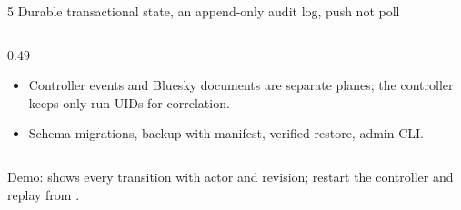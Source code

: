 \begin{frame}{5 \quad Durable transactional state, an append-only audit log, push not poll}
\begin{columns}[T]
\begin{column}{0.49\textwidth}
\begin{block}{\vtwo{}}
\begin{itemize}
                           resume without gaps; 15\,s heartbeat comment.
                    \item Controller events and Bluesky documents are separate planes; the controller keeps
                          only run UIDs for correlation.
                    \item Schema migrations, backup with manifest, verified restore, admin CLI.
                \end{itemize}
            \end{block}
        \end{column}
    \end{columns}
    \vspace{0.1cm}
    {\footnotesize\color{qsgray} Demo:  shows every transition with actor and revision;
    restart the controller and replay from .\par}
\end{frame}

